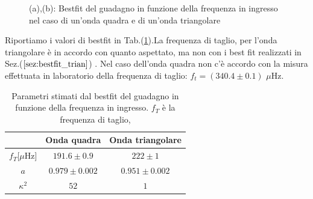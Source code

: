 \documentclass{article}
\begin{document}
\begin{figure}[htbp]
\begin{subfigure}{0.45\textwidth}
                \caption{}
                \label{fig:image2}
            \end{subfigure}
            \caption{(a),(b): Bestfit del guadagno in funzione della frequenza in ingresso nel caso di un'onda quadra e di un'onda triangolare}
            \label{fig:side_by_side_images}
        \end{figure}

        \noindent Riportiamo i valori di bestfit in Tab.(\ref{tab:results}).La frequenza di taglio, per l'onda triangolare è
        in accordo con quanto aspettato, ma non con i best fit realizzati in Sez.($\ref{sez:bestfit_trian}$) .
        Nel caso dell'onda quadra non c'è accordo con la misura effettuata in laboratorio della frequenza di taglio: $f_{t}=(340.4\pm0.1)$ $\mu$Hz. 

        \begin{table}[H]
            \centering
            \begin{tabular}{ccc}
                \hline
                            &Onda quadra        & Onda triangolare\\
                \hline
                $f_T$[$\mu$Hz]  &$191.6\pm0.9$      & $222\pm1$\\
                $a$         &$0.979\pm0.002$    &   $0.951\pm0.002$\\
                $\kappa^2$        & $52   $             &   $1$ \\
            
                \hline
            \end{tabular}
            \caption{Parametri stimati dal bestfit del guadagno in funzione della frequenza in ingresso. $f_T$ è la frequenza di taglio, }
            \label{tab:results}
        \end{table}
        
        
\end{document}
